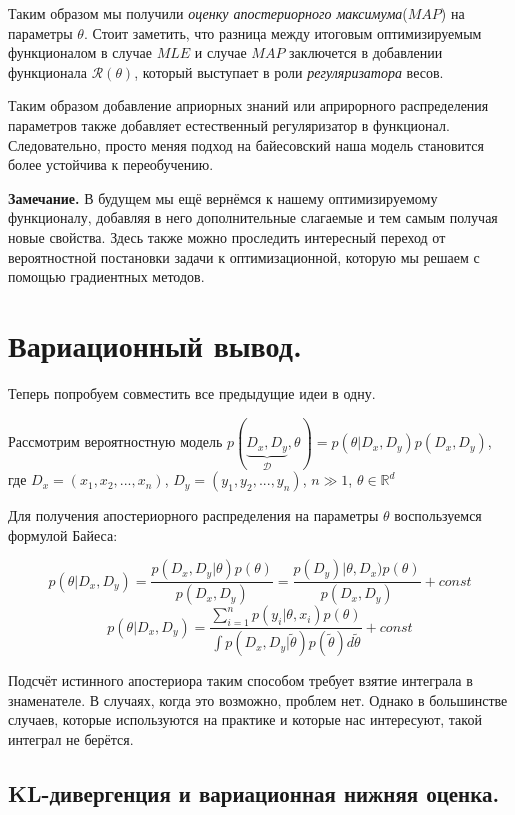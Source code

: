 Таким образом мы получили \textit{оценку апостериорного максимума}($MAP$) на параметры $\theta$. Стоит заметить, что разница между итоговым оптимизируемым функционалом в случае $MLE$ и случае $MAP$ заключется в добавлении функционала $\mathcal{R}(\theta)$,
 который выступает в роли \textit{регуляризатора} весов.

Таким образом добавление априорных знаний или априрорного распределения параметров также добавляет естественный регуляризатор в функционал. Следовательно, просто меняя подход на байесовский наша модель становится более устойчива к переобучению.

\textbf{Замечание.} В будущем мы ещё вернёмся к нашему оптимизируемому функционалу, добавляя в него дополнительные слагаемые и тем самым получая новые свойства.
 Здесь также можно проследить интересный переход от вероятностной постановки задачи к оптимизационной, которую мы решаем с помощью градиентных методов.

\section{Вариационный вывод.}

Теперь попробуем совместить все предыдущие идеи в одну.

Рассмотрим вероятностную модель $p(\underbrace{D_x, D_y}_{\mathcal{D}}, \theta) = p(\theta | D_x, D_y) p(D_x, D_y)$, где $D_x = (x_1, x_2, ..., x_n)$,
 $D_y = (y_1, y_2, ..., y_n)$, $n \gg 1$, $\theta \in \mathbb{R}^d$

Для получения апостериорного распределения на параметры $\theta$ воспользуемся формулой Байеса:

$$p(\theta | D_x, D_y) = \frac{p(D_x, D_y | \theta) p(\theta)}{p(D_x, D_y)} = \frac{p(D_y) | \theta, D_x) p(\theta)}{p(D_x, D_y)} + const$$
$$p(\theta | D_x, D_y) = \frac{\sum_{i=1}^n p(y_i | \theta, x_i) p(\theta)}{\int p(D_x, D_y | \widetilde{\theta})p(\widetilde{\theta}) d\widetilde{\theta}} + const$$

Подсчёт истинного апостериора таким способом требует взятие интеграла в знаменателе. В случаях, когда это возможно, проблем нет. Однако в большинстве случаев, которые используются на практике и которые нас интересуют, такой интеграл не берётся.

\subsection{KL-дивергенция и вариационная нижняя оценка.}

